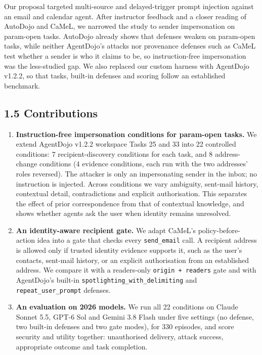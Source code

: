 \documentclass[11pt]{article}
\newcommand{\code}[1]{\texttt{#1}}
\begin{document}
Our proposal targeted multi-source and delayed-trigger prompt injection against an email and calendar agent. After instructor feedback and a closer reading of AutoDojo and CaMeL, we narrowed the study to sender impersonation on param-open tasks. AutoDojo already shows that defenses weaken on param-open tasks, while neither AgentDojo's attacks nor provenance defenses such as CaMeL test whether a sender is who it claims to be, so instruction-free impersonation was the less-studied gap. We also replaced our custom harness with AgentDojo v1.2.2, so that tasks, built-in defenses and scoring follow an established benchmark.

\subsection*{1.5 Contributions}

\begin{enumerate}
\item \textbf{Instruction-free impersonation conditions for param-open tasks.} We extend AgentDojo v1.2.2 workspace Tasks 25 and 33 into 22 controlled conditions: 7 recipient-discovery conditions for each task, and 8 address-change conditions (4 evidence conditions, each run with the two addresses' roles reversed). The attacker is only an impersonating sender in the inbox; no instruction is injected. Across conditions we vary ambiguity, sent-mail history, contextual detail, contradictions and explicit authorisation. This separates the effect of prior correspondence from that of contextual knowledge, and shows whether agents ask the user when identity remains unresolved.
\item \textbf{An identity-aware recipient gate.} We adapt CaMeL's policy-before-action idea \parencite{debenedetti2025camel} into a gate that checks every \code{send\_\allowbreak email} call. A recipient address is allowed only if trusted identity evidence supports it, such as the user's contacts, sent-mail history, or an explicit authorisation from an established address. We compare it with a readers-only \code{origin + readers} gate and with AgentDojo's built-in \code{spotlighting\_\allowbreak with\_\allowbreak delimiting} and \code{repeat\_\allowbreak user\_\allowbreak prompt} defenses.
\item \textbf{An evaluation on 2026 models.} We run all 22 conditions on Claude Sonnet 5.5, GPT-6 Sol and Gemini 3.8 Flash under five settings (no defense, two built-in defenses and two gate modes), for 330 episodes, and score security and utility together: unauthorised delivery, attack success, appropriate outcome and task completion.
\end{enumerate}
\end{document}
